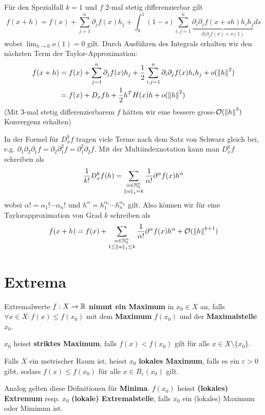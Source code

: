 Für den Spezialfall $k = 1$ und $f$ 2-mal stetig differenzierbar gilt
$$f(x+h) = f(x) + \sum_{j=1}^n \partial_j f(x) h_j + \int_0^1 (1-s) \sum_{i,j = 1}^n \underbrace{\partial_i \partial_j f(x+sh) h_i h_j}_{\partial_i \partial_j f(x) + o(1)} ds$$
wobei $\lim_{h \to 0} o (1) = 0$ gilt. Durch Ausführen des Integrals erhalten wir den nächsten Term der Taylor-Approximation:
\begin{align*}
    f(x+h) &= f(x) + \sum_{j=1}^n \partial_j f(x) h_j  + \frac{1}{2}\sum_{i,j=1}^n \partial_i \partial_j f(x)h_i h_j + o(\left\|h\right\|^2)\\
    &= f(x) + D_xf h + \frac{1}{2} h^TH(x)h + o(\left\|h\right\|^2)
\end{align*}
(Mit 3-mal stetig differenzierbarem $f$ hätten wir eine bessere gross-$\mathcal{O}(\left\|h\right\|^3)$ Konvergenz erhalten)

\begin{remark}
In der Formel für $D^k_xf$ tragen viele Terme nach dem Satz von Schwarz gleich bei, e.g. $\partial_1 \partial_2 \partial_1 f =  \partial_2 \partial_1^2 f = \partial_1^2\partial_2f$. Mit der Multiindexnotation kann man $D_x^kf$ schreiben als 
$$\frac{1}{k!}D_x^kf (h) = \sum_{\substack{\alpha \in \mathbb{N}_0^n\\\left\|\alpha\right\|_1 = k}} \frac{1}{\alpha!} \partial^\alpha f(x) h^\alpha $$
wobei $\alpha! = \alpha_1! \cdots \alpha_n!$ und $h^\alpha = h_1^{\alpha_1}\cdots h_n^{\alpha_n}$ gilt. Also können wir für eine Taylorapproximation von Grad $k$ schreiben als
$$f(x+h) = f(x) + \sum_{\substack{\alpha \in \mathbb{N}_0^n\\1 \leq \left\|\alpha\right\|_1 \leq k}} \frac{1}{\alpha!} \partial^\alpha f(x) h^\alpha + \mathcal{O}(\left\|h\right\|^{k+1})$$
\end{remark}

\section{Extrema}
\begin{definition}{Extremalwerte}{}
$f: X \to \mathbb{R}$ \textbf{nimmt ein Maximum} in $x_0 \in X$ an, falls $\forall x \in X: f(x) \leq f(x_0)$ mit dem \textbf{Maximum} $f(x_0)$ und der \textbf{Maximalstelle} $x_0$.

$x_0$ heisst \textbf{striktes Maximum}, falls $f(x) < f(x_0)$ gilt für alle $x \in X \setminus \{x_0\}$.

Falls $X$ ein metrischer Raum ist, heisst $x_0$ \textbf{lokales Maximum}, falls es ein $\varepsilon > 0$ gibt, sodass $f(x) \leq f(x_0)$ für alle $x \in B_\varepsilon(x_0)$ gilt.

Analog gelten diese Definitionen für \textbf{Minima}. $f(x_0)$ heisst \textbf{(lokales) Extremum} resp. $x_0$ \textbf{(lokale) Extremalstelle}, falls $x_0$ ein (lokales) Maximum oder Miminum ist.
\end{definition}

